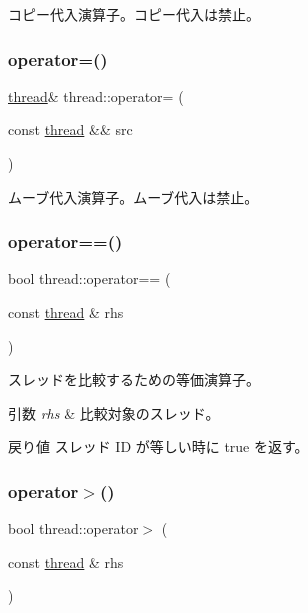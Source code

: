 コピー代入演算子。コピー代入は禁止。 \hypertarget{classthread_aa248d01f65405fe1f03c1526c54d038f}{}\label{classthread_aa248d01f65405fe1f03c1526c54d038f} 
\subsubsection{\texorpdfstring{operator=()}{operator=()}\hspace{0.1cm}{\footnotesize\ttfamily [2/2]}}
{\footnotesize\ttfamily \hyperlink{classthread}{thread}\& thread\+::operator= (\begin{DoxyParamCaption}\item[{const \hyperlink{classthread}{thread} \&\&}]{src }\end{DoxyParamCaption})\hspace{0.3cm}{\ttfamily [delete]}}

ムーブ代入演算子。ムーブ代入は禁止。 \hypertarget{classthread_accfc6460fe7c41635f41d9ad56554eb5}{}\label{classthread_accfc6460fe7c41635f41d9ad56554eb5} 
\subsubsection{\texorpdfstring{operator==()}{operator==()}}
{\footnotesize\ttfamily bool thread\+::operator== (\begin{DoxyParamCaption}\item[{const \hyperlink{classthread}{thread} \&}]{rhs }\end{DoxyParamCaption})}

スレッドを比較するための等価演算子。 
\begin{DoxyParams}{引数}
{\em rhs} & 比較対象のスレッド。 \\
\hline
\end{DoxyParams}
\begin{DoxyReturn}{戻り値}
スレッド ID が等しい時に true を返す。 
\end{DoxyReturn}
\hypertarget{classthread_a8ac74ad7dd695e6c9b46a17ade8a4c12}{}\label{classthread_a8ac74ad7dd695e6c9b46a17ade8a4c12} 
\subsubsection{\texorpdfstring{operator$>$()}{operator>()}}
{\footnotesize\ttfamily bool thread\+::operator$>$ (\begin{DoxyParamCaption}\item[{const \hyperlink{classthread}{thread} \&}]{rhs }\end{DoxyParamCaption})}

